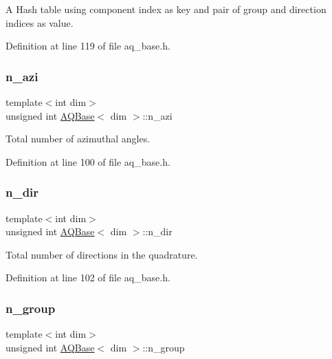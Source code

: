 A Hash table using component index as key and pair of group and direction indices as value. 

Definition at line 119 of file aq\+\_\+base.\+h.

\mbox{\label{class_a_q_base_aaff6bd848436445d267c1a121a93e4ea}} 
\subsubsection{\texorpdfstring{n\+\_\+azi}{n\_azi}}
{\footnotesize\ttfamily template$<$int dim$>$ \\
unsigned int \hyperlink{class_a_q_base}{A\+Q\+Base}$<$ dim $>$\+::n\+\_\+azi\hspace{0.3cm}{\ttfamily [protected]}}



Total number of azimuthal angles. 



Definition at line 100 of file aq\+\_\+base.\+h.

\mbox{\label{class_a_q_base_a93b0c70dd1d3ec401601ceaca88723b1}} 
\subsubsection{\texorpdfstring{n\+\_\+dir}{n\_dir}}
{\footnotesize\ttfamily template$<$int dim$>$ \\
unsigned int \hyperlink{class_a_q_base}{A\+Q\+Base}$<$ dim $>$\+::n\+\_\+dir\hspace{0.3cm}{\ttfamily [protected]}}



Total number of directions in the quadrature. 



Definition at line 102 of file aq\+\_\+base.\+h.

\mbox{\label{class_a_q_base_a07b0839db1844f879f3d9c7d7014fb7f}} 
\subsubsection{\texorpdfstring{n\+\_\+group}{n\_group}}
{\footnotesize\ttfamily template$<$int dim$>$ \\
unsigned int \hyperlink{class_a_q_base}{A\+Q\+Base}$<$ dim $>$\+::n\+\_\+group\hspace{0.3cm}{\ttfamily [protected]}}



